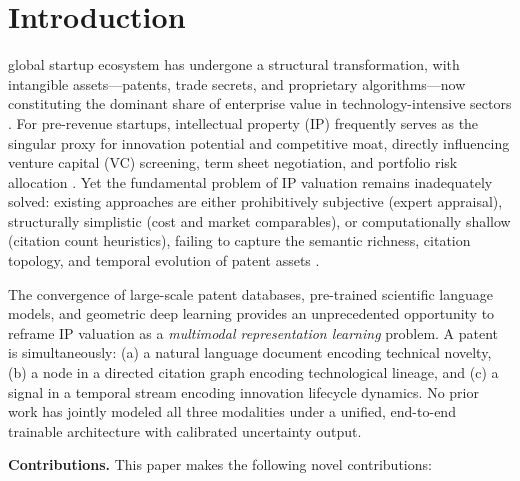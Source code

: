 \documentclass[journal]{IEEEtran}
\begin{document}
\section{Introduction}

 global startup ecosystem has undergone a structural transformation, with intangible assets—patents, trade secrets, and proprietary algorithms—now constituting the dominant share of enterprise value in technology-intensive sectors \cite{lev2001intangibles, hall2005market}. For pre-revenue startups, intellectual property (IP) frequently serves as the singular proxy for innovation potential and competitive moat, directly influencing venture capital (VC) screening, term sheet negotiation, and portfolio risk allocation \cite{cockburn2018ai}. Yet the fundamental problem of IP valuation remains inadequately solved: existing approaches are either prohibitively subjective (expert appraisal), structurally simplistic (cost and market comparables), or computationally shallow (citation count heuristics), failing to capture the semantic richness, citation topology, and temporal evolution of patent assets \cite{ernst2003patent}.

The convergence of large-scale patent databases, pre-trained scientific language models, and geometric deep learning provides an unprecedented opportunity to reframe IP valuation as a \textit{multimodal representation learning} problem. A patent is simultaneously: (a) a natural language document encoding technical novelty, (b) a node in a directed citation graph encoding technological lineage, and (c) a signal in a temporal stream encoding innovation lifecycle dynamics. No prior work has jointly modeled all three modalities under a unified, end-to-end trainable architecture with calibrated uncertainty output.

\textbf{Contributions.} This paper makes the following novel contributions:
\end{document}
